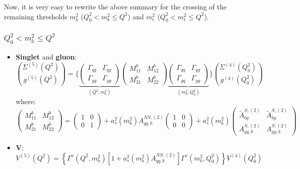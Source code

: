 \documentclass[10pt,a4paper]{article}
\begin{document}
Now, it is very easy to rewrite the above summary for the crossing of
the remaining thresholds $m_b^2$ ($Q_0^2<m_b^2\leq Q^2$) and $m_t^2$
($Q_0^2<m_t^2\leq Q^2$).

\subsubsection{$Q_0^2<m_b^2\leq Q^2$}
\begin{itemize}
\item \textbf{Singlet} and \textbf{gluon}:
\begin{equation}
{\Sigma^{(5)}(Q^2) \choose g^{(5)}(Q^2)} = \Bigg\{\underbrace{\begin{pmatrix} \Gamma_{qq} & \Gamma_{qg} \\ \Gamma_{gq}& \Gamma_{gg}\end{pmatrix}}_{(Q^2,m_b^2)}\begin{pmatrix} M_{11}^b & M_{12}^b \\ M_{21}^b & M_{22}^b\end{pmatrix}\underbrace{\begin{pmatrix} \Gamma_{qq}& \Gamma_{qg} \\ \Gamma_{gq}& \Gamma_{gg}\end{pmatrix}}_{(m_b^2,Q_0^2)}\Bigg\}{\Sigma^{(4)}(Q_0^2) \choose g^{(4)}(Q_0^2)}
\end{equation}
where:
\begin{equation}
\begin{pmatrix} M_{11}^b & M_{12}^b \\ M_{21}^b & M_{22}^b\end{pmatrix}=\begin{pmatrix} 1 & 0 \\ 0 & 1\end{pmatrix}+a_s^2(m_b^2)A_{qq,b}^{N\!S,(2)}\begin{pmatrix} 1 & 0 \\ 0 & 0\end{pmatrix}+a_s^2(m_b^2)\begin{pmatrix} \tilde{A}^{S,(2)}_{bq} & \tilde{A}^{S,(2)}_{bg} \\A^{S,(2)}_{gq,b} & A_{gg,b}^{S,(2)}\end{pmatrix}
\end{equation}
\item $\mathbf{V}$:
\begin{equation}
V^{(5)}(Q^2)=\left\{\Gamma^{v}(Q^2,m_b^2)[1+a_s^2(m_b^2)A_{qq,b}^{N\!S,(2)}]\Gamma^{v}(m_b^2,Q_0^2)\right\}V^{(4)}(Q^2_0)
\end{equation}

\end{itemize}
\end{document}
